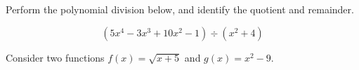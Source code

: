 \begin{questions}
    

    



\newpage

\question[10]  
    Perform the polynomial division below, and identify the quotient and remainder.
    
    
    
    
    \begin{equation*} %
        \left(5 x^4-3 x^3+10 x^2-1\right) \div\left(x^2+4\right)
    \end{equation*}
    



\newpage

\question
    Consider two functions $f(x) = \sqrt{x+5}$ and $g(x) = x^2 -9$.
    
\end{questions}
